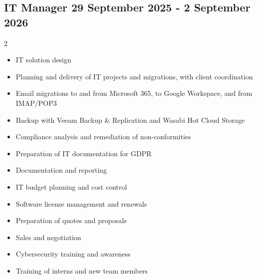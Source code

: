 \documentclass[a4paper, 10pt]{article}
\begin{document}
	\subsection*{IT Manager \hfill \normalsize 29 September 2025 - 2 September 2026}
	\begin{multicols}{2}
		\raggedright
		\begin{itemize}
		\item IT solution design
		
		\item Planning and delivery of IT projects and migrations, with client coordination
		
		\item Email migrations to and from Microsoft 365, to Google Workspace, and from IMAP/POP3
		
		\item Backup with Veeam Backup \& Replication and Wasabi Hot Cloud Storage
		
		\item Compliance analysis and remediation of non-conformities
		
		\item Preparation of IT documentation for GDPR
		
		\item Documentation and reporting
		
		\item IT budget planning and cost control
		
		\item Software license management and renewals
		
		\item Preparation of quotes and proposals
		
		\item Sales and negotiation
		
		\item Cybersecurity training and awareness
		
		\item Training of interns and new team members
		\end{itemize}
	\end{multicols}
	
\end{document}
